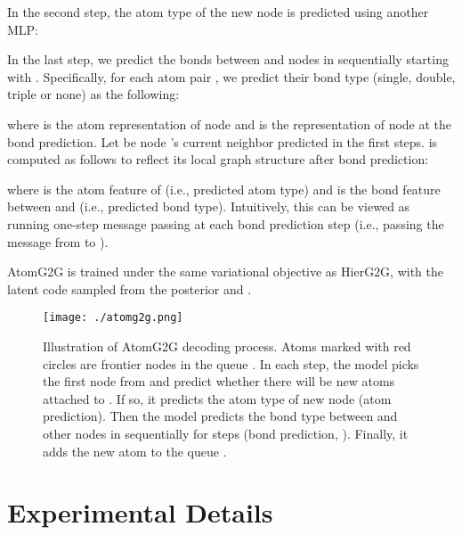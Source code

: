 \documentclass{article} \usepackage{iclr2020_conference,times}
\begin{document}
In the second step, the atom type of the new node  is predicted using another MLP:

In the last step, we predict the bonds between  and nodes in  sequentially starting with . Specifically, for each atom pair , we predict their bond type (single, double, triple or none) as the following:

where  is the atom representation of node  and  is the representation of node  at the  bond prediction. Let  be node 's current neighbor predicted in the first  steps.  is computed as follows to reflect its local graph structure after  bond prediction:

where  is the atom feature of  (i.e., predicted atom type) and  is the bond feature between  and  (i.e., predicted bond type). Intuitively, this can be viewed as running one-step message passing at each bond prediction step (i.e., passing the message  from  to ).

AtomG2G is trained under the same variational objective as HierG2G, with the latent code  sampled from the posterior  and . 

\begin{figure}[t]
    \centering
    \texttt{[image: ./atomg2g.png]}
    \caption{Illustration of AtomG2G decoding process. Atoms marked with red circles are frontier nodes in the queue . In each step, the model picks the first node  from  and predict whether there will be new atoms attached to . If so, it predicts the atom type of new node  (atom prediction). Then the model predicts the bond type between  and other nodes in  sequentially for  steps (bond prediction, ). Finally, it adds the new atom to the queue .}
    \label{fig:atomg2g}
\end{figure}

\section{Experimental Details}
\end{document}
